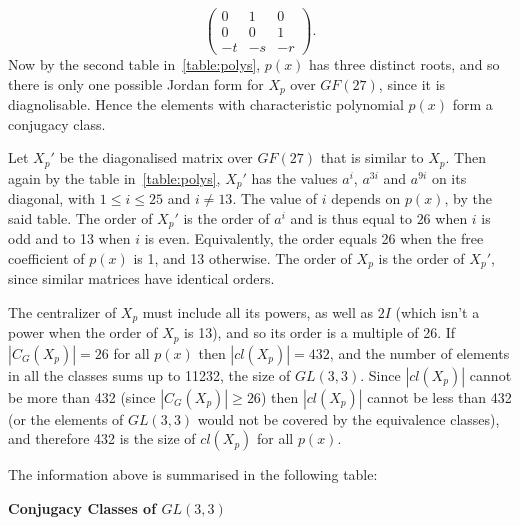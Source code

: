 \documentclass[11pt]{article} \usepackage{amssymb}
\begin{document}
\begin{enumerate}
\begin{enumerate}
\begin{itemize}
\begin{equation*}
\begin{pmatrix}
            0&1  &0 \\ 
            0&0  &1 \\ 
            -t&-s  &-r 
          \end{pmatrix}.
        \end{equation*}
        Now by the second table in~\ref{table:polys}, $p(x)$ has three 
        distinct roots, and so there is only one possible Jordan form for $X_p$
        over $GF(27)$, since it is diagnolisable.
        Hence the elements with characteristic polynomial $p(x)$
        form a conjugacy class.
        
        Let $X_p'$ be the diagonalised matrix over $GF(27)$ that is similar
        to $X_p$. Then again by the table in~\ref{table:polys}, $X_p'$ has
        the values $a^i$, $a^{3i}$ and $a^{9i}$ on its diagonal, with $1 \leq i \leq 25$ and
        $i \neq 13$. The value of $i$ depends on $p(x)$, by the said table.
        The order of $X_p'$ is the order of $a^i$
        and is thus equal to $26$ when $i$ is odd and to 13 when $i$ is even.
        Equivalently, the order equals
        26 when the free coefficient of $p(x)$ is 1, and 13 otherwise.
        The order of $X_p$ is the order of $X_p'$, 
        since similar matrices have identical orders.

        The centralizer of $X_p$ must include all its powers, as well as
        $2I$ (which isn't a power when the order of $X_p$ is 13), and so its 
        order is a multiple of 26. If $|C_G(X_p)|=26$ for all $p(x)$ then
        $|cl(X_p)|=432$, and the number of elements in all the classes sums
        up to 11232, the size of $GL(3,3)$. Since $|cl(X_p)|$ cannot be more
        than 432 (since $|C_G(X_p)| \geq 26$) then $|cl(X_p)|$ cannot be less
        than 432 (or the elements of $GL(3,3)$ would not be covered by the
        equivalence classes), and therefore 432 is the size of $cl(X_p)$
        for all $p(x)$. 
      \end{itemize}
      The information above is summarised in the following table:

      {\bf Conjugacy Classes of $GL(3,3)$}


\end{enumerate}
\end{enumerate}
\end{document}

